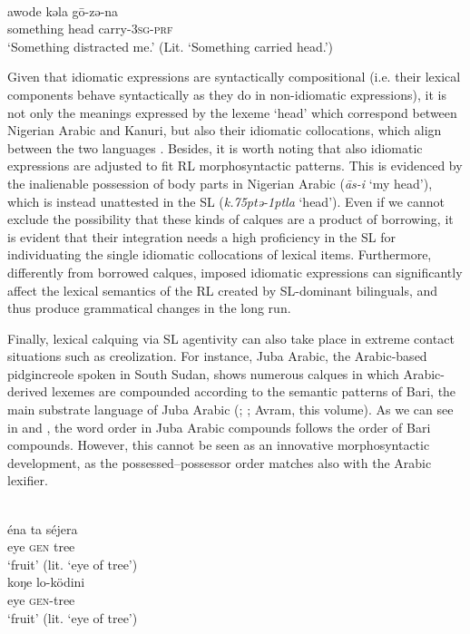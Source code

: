 \documentclass[output=paper]{langsci/langscibook}
\begin{document}
\\
\gll   awode kǝla   gō-zǝ-na \\
       something head carry-\textsc{3sg-prf}\\
\glt   `Something distracted me.' (Lit. ‘Something carried head.’)
\z
\z

Given that idiomatic expressions are syntactically compositional (i.e. their lexical components behave syntactically as they do in non-idiomatic expressions), it is not only the meanings expressed by the lexeme ‘head’ which correspond between Nigerian Arabic and Kanuri, but also their idiomatic collocations, which align between the two languages \citep[157]{Owens2014}. Besides, it is worth noting that also idiomatic expressions are adjusted to fit RL morphosyntactic patterns. This is evidenced by the inalienable possession of body parts in Nigerian Arabic (\textit{{\R}ās-i} ‘my head’), which is instead unattested in the SL (\textit{k\kern .75ptǝ\kern -1ptla} ‘head’). Even if we cannot exclude the possibility that these kinds of calques are a product of borrowing, it is evident that their integration needs a high proficiency in the SL for individuating the single idiomatic collocations of lexical items. Furthermore, differently from borrowed calques, imposed idiomatic expressions can significantly affect the lexical semantics of the RL created by SL-dominant bilinguals, and thus produce grammatical changes in the long run. 

Finally, lexical calquing via SL agentivity can also take place in extreme contact situations such as creolization. For instance, Juba Arabic, the Arabic-based pidgincreole spoken in South Sudan, shows numerous calques in which Arabic-derived lexemes are compounded according to the semantic patterns of Bari, the main substrate language of Juba Arabic (\citealt{Nakao2012}; \citealt[50]{Manfredi2017}; Avram, this volume). As we can see in  and , the word order in Juba Arabic compounds follows the order of Bari compounds. However, this cannot be seen as an innovative morphosyntactic development, as the possessed–possessor order matches also with the Arabic lexifier. 

\ea\label{tree}
 \\
\gll   éna ta séjera  \\
       eye \textsc{gen} tree \\
\glt   `fruit’ (lit. ‘eye of tree’)
\newpage
{}\\
\gll   koŋe lo-ködini\\
       eye \textsc{gen}-tree\\
\glt   `fruit’ (lit. ‘eye of tree’)
\z
\z
\end{document}
